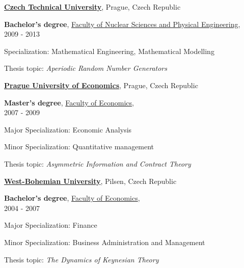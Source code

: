 \documentclass[10pt]{article}
\newenvironment{outerlist}[0]%
        {\begin{itemize}}
	{\end{itemize}
         \vspace{-.6\baselineskip}}
\newenvironment{innerlist}[0]%
        {\begin{compactitem}}
	{\end{compactitem}}
\newcommand{\blankline}{\quad\pagebreak[2]}
\begin{document}
\blankline

\href{http://cvut.cz/}{\textbf{Czech Technical University}},
Prague, Czech Republic
\begin{outerlist}
  
  \item[] \textbf{Bachelor's degree},
	  \href{http://www.fjfi.cvut.cz}
	      {Faculty of Nuclear Sciences and Physical Engineering},\\
	      2009 - 2013
	  \begin{innerlist}
	    \item Specialization: Mathematical Engineering, Mathematical Modelling
	    \item Thesis topic: \emph{Aperiodic Random Number Generators} 
	  \end{innerlist}
\end{outerlist}

\blankline

\href{http://www.vse.cz/}{\textbf{Prague University of Economics}},
Prague, Czech Republic
\begin{outerlist}
  
  \item[] \textbf{Master's degree},
	  \href{http://nf.vse.cz/}
	      {Faculty of Economics},\\
	      2007 - 2009
	  \begin{innerlist}
	    \item Major Specialization: Economic Analysis
	    \item Minor Specialization: Quantitative management 
	    \item Thesis topic: \emph{Asymmetric Information and Contract Theory} 
	  \end{innerlist}
\end{outerlist}

\blankline

\href{http://www.zcu.cz//}{\textbf{West-Bohemian University}},
Pilsen, Czech Republic
\begin{outerlist}
  
  \item[] \textbf{Bachelor's degree},
	  \href{http://fek.zcu.cz/}
	      {Faculty of Economics},\\
	      2004 - 2007
	  \begin{innerlist}
	    \item Major Specialization: Finance
	    \item Minor Specialization: Business Administration and Management  
	    \item Thesis topic: \emph{The Dynamics of Keynesian Theory} 
	  \end{innerlist}
\end{outerlist}
\end{document}
